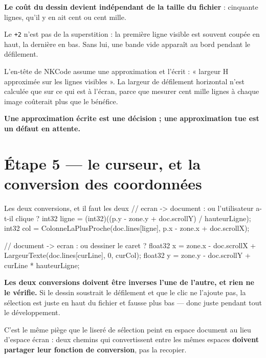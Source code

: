 \begin{nkretenir}
\textbf{Le coût du dessin devient indépendant de la taille du fichier} :
cinquante lignes, qu'il y en ait cent ou cent mille.

Le \texttt{+2} n'est pas de la superstition : la première ligne visible est
souvent coupée en haut, la dernière en bas. Sans lui, une bande vide apparaît au
bord pendant le défilement.
\end{nkretenir}

\begin{nkretenir}
L'en-tête de NKCode assume une approximation et l'écrit : « largeur H approximée
sur les lignes visibles ». La largeur de défilement horizontal n'est calculée que
sur ce qui est à l'écran, parce que mesurer cent mille lignes à chaque image
coûterait plus que le bénéfice.

\textbf{Une approximation écrite est une décision ; une approximation tue est un
défaut en attente.}
\end{nkretenir}

\section{Étape 5 --- le curseur, et la conversion des coordonnées}

\begin{nkcode}{Les deux conversions, et il faut les deux}
// ecran -> document : ou l'utilisateur a-t-il clique ?
int32 ligne = (int32)((p.y - zone.y + doc.scrollY) / hauteurLigne);
int32 col   = ColonneLaPlusProche(doc.lines[ligne], p.x - zone.x + doc.scrollX);

// document -> ecran : ou dessiner le caret ?
float32 x = zone.x - doc.scrollX + LargeurTexte(doc.lines[curLine], 0, curCol);
float32 y = zone.y - doc.scrollY + curLine * hauteurLigne;
\end{nkcode}

\begin{nkpiege}
\textbf{Les deux conversions doivent être inverses l'une de l'autre, et rien ne
le vérifie.} Si le dessin soustrait le défilement et que le clic ne l'ajoute pas,
la sélection est juste en haut du fichier et fausse plus bas --- donc juste
pendant tout le développement.

C'est le même piège que le liseré de sélection peint en espace document au lieu
d'espace écran : deux chemins qui convertissent entre les mêmes espaces
\textbf{doivent partager leur fonction de conversion}, pas la recopier.
\end{nkpiege}

